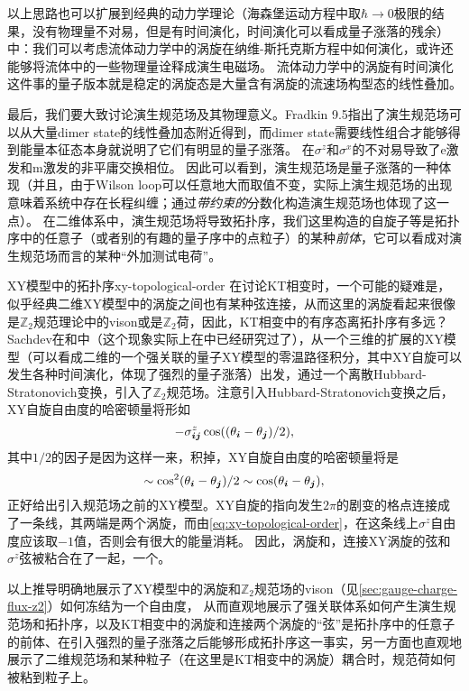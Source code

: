 以上思路也可以扩展到经典的动力学理论（海森堡运动方程中取$\hbar \to 0$极限的结果，没有物理量不对易，但是有时间演化，时间演化可以看成量子涨落的残余）中：我们可以考虑流体动力学中的涡旋在纳维-斯托克斯方程中如何演化，或许还能够将流体中的一些物理量诠释成演生电磁场。
流体动力学中的涡旋有时间演化这件事的量子版本就是稳定的涡旋态是大量含有涡旋的流速场构型态的线性叠加。

最后，我们要大致讨论演生规范场及其物理意义。Fradkin 9.5指出了演生规范场可以从大量dimer state的线性叠加态附近得到，而dimer state需要线性组合才能够得到能量本征态本身就说明了它们有明显的量子涨落。
在$\sigma^z$和$\sigma^x$的不对易导致了e激发和m激发的非平庸交换相位。
因此可以看到，演生规范场是量子涨落的一种体现（并且，由于Wilson loop可以任意地大而取值不变，实际上演生规范场的出现意味着系统中存在长程纠缠；通过\emph{带约束的}分数化构造演生规范场也体现了这一点）。
在二维体系中，演生规范场将导致拓扑序，我们这里构造的自旋子等是拓扑序中的任意子（或者别的有趣的量子序中的点粒子）的某种\emph{前体}，它可以看成对演生规范场而言的某种“外加测试电荷”。

\begin{info}{XY模型中的拓扑序}{xy-topological-order}
    在讨论KT相变时，一个可能的疑难是，似乎经典二维XY模型中的涡旋之间也有某种弦连接，从而这里的涡旋看起来很像是$\mathbb{Z}_2$规范理论中的vison或是$\mathbb{Z}_2$荷，因此，KT相变中的有序态离拓扑序有多远？
    Sachdev在\cite{sachdev_xy}和\cite{Sachdev_2018_full}中（这个现象实际上在\cite{sedgewick2002}中已经研究过了），从一个三维的扩展的XY模型（可以看成二维的一个强关联的量子XY模型的零温路径积分，其中XY自旋可以发生各种时间演化，体现了强烈的量子涨落）出发，通过一个离散Hubbard-Stratonovich变换，引入了$\mathbb{Z}_2$规范场。注意引入Hubbard-Stratonovich变换之后，XY自旋自由度的哈密顿量将形如
    \begin{equation}
        - \sigma^z_{\vb*{i} \vb*{j}} \cos((\theta_{\vb*{i}} - \theta_{\vb*{j}}) / 2),
        \label{eq:xy-topological-order}
    \end{equation}
    其中$1/2$的因子是因为这样一来，积掉，XY自旋自由度的哈密顿量将是
    \[
        \sim \cos^2(\theta_{\vb*{i}} - \theta_{\vb*{j}}) / 2 \sim \cos (\theta_{\vb*{i}} - \theta_{\vb*{j}}),
    \]
    正好给出引入规范场之前的XY模型。XY自旋的指向发生$2\pi$的剧变的格点连接成了一条线，其两端是两个涡旋，而由\eqref{eq:xy-topological-order}，在这条线上$\sigma^z$自由度应该取$-1$值，否则会有很大的能量消耗。
    因此，涡旋和，连接XY涡旋的弦和$\sigma^z$弦被粘合在了一起，一个。

    以上推导明确地展示了XY模型中的涡旋和$\mathbb{Z}_2$规范场的vison（见\autoref{sec:gauge-charge-flux-z2}）如何冻结为一个自由度，
    从而直观地展示了强关联体系如何产生演生规范场和拓扑序，以及KT相变中的涡旋和连接两个涡旋的“弦”是拓扑序中的任意子的前体、在引入强烈的量子涨落之后能够形成拓扑序这一事实，另一方面也直观地展示了二维规范场和某种粒子（在这里是KT相变中的涡旋）耦合时，规范荷如何被粘到粒子上。
\end{info}

